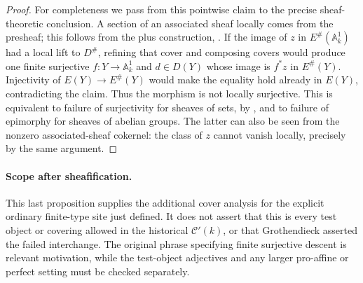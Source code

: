 \begin{proof}
For completeness we pass from this pointwise claim to the precise
sheaf-theoretic conclusion.  A section of an associated sheaf locally
comes from the presheaf; this follows from the plus construction,
\cite[Lemma~7.10.8 and Theorem~7.10.10]{BStacks}.  If the image of $z$
in $E^\#(\mathbb A^1_k)$ had a local lift to $D^\#$, refining that
cover and composing covers would produce one finite surjective
$f:Y\to\mathbb A^1_k$ and $d\in D(Y)$ whose image is $f^*z$ in
$E^\#(Y)$.  Injectivity of $E(Y)\to E^\#(Y)$ would make the equality
hold already in $E(Y)$, contradicting the claim.  Thus the morphism
is not locally surjective.  This is equivalent to failure of
surjectivity for sheaves of sets, by
\cite[Definition~7.11.1 and Lemma~7.11.2]{BStacks}, and to failure of
epimorphy for sheaves of abelian groups.  The latter can also be seen
from the nonzero associated-sheaf cokernel: the class of $z$ cannot
vanish locally, precisely by the same argument.
\end{proof}

\paragraph{Scope after sheafification.}
This last proposition supplies the additional cover analysis for the
explicit ordinary finite-type site just defined.  It does not assert
that this is every test object or covering allowed in the historical
$\mathcal C'(k)$, or that Grothendieck asserted the failed interchange.
The original phrase specifying finite surjective descent is relevant
motivation, while the test-object adjectives and any larger
pro-affine or perfect setting must be checked separately.
